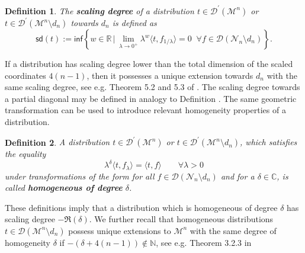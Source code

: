 \documentclass[10pt]{book}
\newcommand{\sd}{\mathsf{sd}}
\renewcommand{\inf}{\mathsf{inf}}
\newcommand{\Dcal}{\mathcal{D}}
\newcommand{\Mcal}{\mathcal{M}}
\newcommand{\Ncal}{\mathcal{N}}
\theoremstyle{break}
\newtheorem{definition}{Definition}
\begin{document}
\begin{definition}
The {\bf scaling degree} of a distribution $t\in \Dcal^\prime(\Mcal^n)$ or $t\in \Dcal^\prime(\Mcal^n\setminus d_n)$ towards $d_n$ 
is defined as 
\[
\sd(t) := \inf\left \{w \in \mathbb{R}\,\big|\, \lim_{\lambda \to 0^+}\lambda^{w} \langle t,f_{1/\lambda} \rangle  = 0\;\;\forall f\in\Dcal(\Ncal_n\setminus d_n) \right\}.
\] 
\end{definition}

If a distribution has scaling degree lower than the total dimension of the scaled coordinates $4(n-1)$, then it possesses a unique extension towards $d_n$ with the same scaling degree, see e.g. Theorem 5.2 and 5.3 of %
. The scaling degree towards a partial diagonal may be defined in analogy to Definition %
. The same geometric transformation %
can be used to introduce relevant homogeneity properties of a distribution.

\begin{definition}
A distribution $t\in \Dcal^\prime(\Mcal^n)$ or $t\in \Dcal^\prime(\Mcal^n\setminus d_n)$, which satisfies the equality 
\[
\lambda^{\delta} \langle t,f_\lambda \rangle    = \langle t,f \rangle \qquad\forall \lambda >0
\]
under transformations of the form %
for all $f\in\Dcal(\Ncal_n\setminus d_n)$ and for a $\delta\in\mathbb{C}$, is called {\bf homogeneous of degree} $\delta$. 
\end{definition}

These definitions imply that a distribution which is homogeneous of degree $\delta$ has scaling degree $-\Re(\delta)$. We further recall that homogeneous distributions $t\in\Dcal(\Mcal^n\setminus d_n)$ possess unique extensions to $\Mcal^n$ with the same degree of homogeneity $\delta$ if $-(\delta+4(n-1))\notin \mathbb{N}$, see e.g. Theorem 3.2.3 in %
\end{document}
